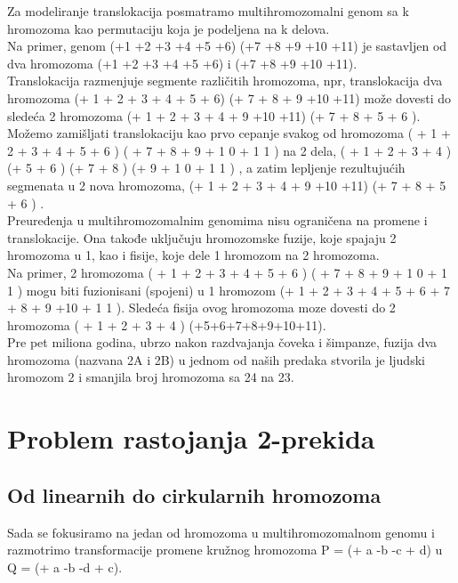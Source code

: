 Za modeliranje translokacija posmatramo multihromozomalni genom sa k hromozoma
kao permutaciju koja je podeljena na k delova.\\

Na primer, genom
(+1 +2 +3 +4 +5 +6) (+7 +8 +9 +10 +11) je sastavljen od dva hromozoma (+1
+2 +3 +4 +5 +6) i (+7 +8 +9 +10 +11). \\

Translokacija razmenjuje segmente
različitih hromozoma, npr, translokacija dva hromozoma
(+ 1 + 2 + 3 + 4 + 5 + 6) (+ 7 + 8 + 9 +10 +11)
može dovesti do sledeća 2 hromozoma
(+ 1 + 2 + 3 + 4 + 9 +10 +11) (+ 7 + 8 + 5 + 6 ).
Možemo zamišljati translokaciju kao prvo cepanje svakog od hromozoma
( + 1 + 2 + 3 + 4 + 5 + 6 ) ( + 7 + 8 + 9 + 1 0 + 1 1 )
na 2 dela,
( + 1 + 2 + 3 + 4 ) (+ 5 + 6 ) (+ 7 + 8 ) (+ 9 + 1 0 + 1 1 ) ,
a zatim lepljenje rezultujućih segmenata u 2 nova hromozoma,
(+ 1 + 2 + 3 + 4 + 9 +10 +11) (+ 7 + 8 + 5 + 6 ) .\\

Preuređenja u multihromozomalnim genomima nisu ograničena na promene i translokacije. Ona takođe uključuju hromozomske fuzije, koje spajaju 2 hromozoma u 1, kao i fisije, koje dele 1 hromozom na 2 hromozoma.\\

Na primer, 2 hromozoma
( + 1 + 2 + 3 + 4 + 5 + 6 ) ( + 7 + 8 + 9 + 1 0 + 1 1 ) mogu biti fuzionisani (spojeni) u 1 hromozom (+ 1 + 2 + 3 + 4 + 5 + 6 + 7 + 8 + 9 +10 + 1 1 ).
Sledeća fisija ovog hromozoma moze dovesti do 2 hromozoma ( + 1 + 2 + 3 + 4 ) (+5+6+7+8+9+10+11).\\

Pre pet miliona godina, ubrzo nakon razdvajanja čoveka i šimpanze, fuzija
dva hromozoma (nazvana 2A i 2B) u jednom od naših predaka stvorila je ljudski hromozom 2 i smanjila broj hromozoma sa 24 na 23.

\section{Problem rastojanja 2-prekida}

\subsection{Od linearnih do cirkularnih hromozoma}

\indent Sada se fokusiramo na jedan od hromozoma u multihromozomalnom genomu i razmotrimo transformacije promene kružnog hromozoma P = (+ a -b -c + d) u Q = (+ a -b
-d + c). \\

